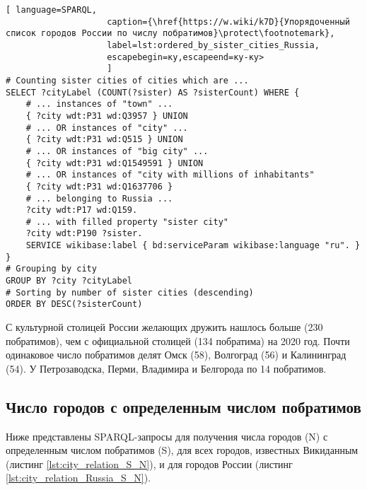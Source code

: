 \begin{lstlisting}[ language=SPARQL, 
                    caption={\href{https://w.wiki/k7D}{Упорядоченный список городов России по числу побратимов}\protect\footnotemark},
                    label=lst:ordered_by_sister_cities_Russia, 
                    escapebegin=ку,escapeend=ку-ку>
                    ]
# Counting sister cities of cities which are ...
SELECT ?cityLabel (COUNT(?sister) AS ?sisterCount) WHERE {           
	# ... instances of "town" ...
	{ ?city wdt:P31 wd:Q3957 } UNION 
	# ... OR instances of "city" ...                                  
	{ ?city wdt:P31 wd:Q515 } UNION   
	# ... OR instances of "big city" ...                                 
	{ ?city wdt:P31 wd:Q1549591 } UNION   
	# ... OR instances of "city with millions of inhabitants"                             
	{ ?city wdt:P31 wd:Q1637706 }     
	# ... belonging to Russia ...                                 
	?city wdt:P17 wd:Q159.   
	# ... with filled property "sister city"                                          
	?city wdt:P190 ?sister.                                            
	SERVICE wikibase:label { bd:serviceParam wikibase:language "ru". }
}
# Grouping by city
GROUP BY ?city ?cityLabel  
# Sorting by number of sister cities (descending)                                          
ORDER BY DESC(?sisterCount)                                          
\end{lstlisting}

С культурной столицей России желающих дружить нашлось больше (230 побратимов), чем с официальной столицей (134 побратима) на 2020 год. Почти одинаковое число побратимов делят Омск (58), Волгоград (56) и Калининград (54). У Петрозаводска, Перми, Владимира и Белгорода по 14 побратимов.

\subsection{Число городов с определенным числом побратимов}

Ниже представлены SPARQL-запросы для получения числа городов (N) с определенным числом побратимов (S), для всех городов, известных Викиданным (листинг \ref{lst:city_relation_S_N}), и для городов России (листинг \ref{lst:city_relation_Russia_S_N}).

